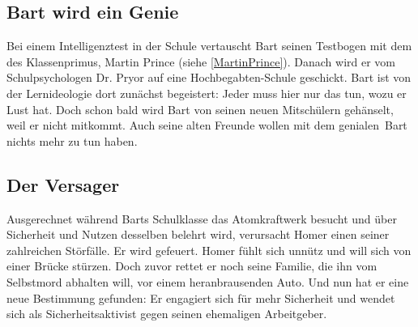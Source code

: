 \subsection{Bart wird ein Genie}\label{7G02}
Bei einem Intelligenztest in der Schule vertauscht Bart seinen Testbogen mit dem des Klassenprimus, Martin Prince (siehe \ref{MartinPrince}). Danach wird er vom Schulpsychologen Dr. Pryor auf eine Hochbegabten-Schule geschickt. Bart ist von der Lernideologie dort zunächst begeistert: Jeder muss hier nur das tun, wozu er Lust hat. Doch schon bald wird Bart von seinen neuen Mitschülern gehänselt, weil er nicht mitkommt. Auch seine alten Freunde wollen mit dem \glqq genialen\grqq\ Bart nichts mehr zu tun haben.


\subsection{Der Versager}\label{7G03}
Ausgerechnet während Barts Schulklasse das Atomkraftwerk besucht und über Sicherheit und Nutzen desselben belehrt wird, verursacht Homer einen seiner zahlreichen Störfälle. Er wird gefeuert. Homer fühlt sich unnütz und will sich von einer Brücke stürzen. Doch zuvor rettet er noch seine Familie, die ihn vom Selbstmord abhalten will, vor einem heranbrausenden Auto. Und nun hat er eine neue Bestimmung gefunden: Er engagiert sich für mehr Sicherheit und wendet sich als Sicherheitsaktivist gegen seinen ehemaligen Arbeitgeber.



